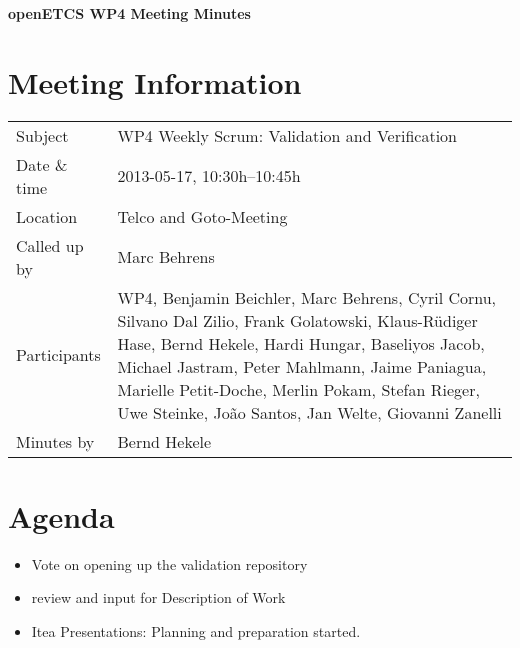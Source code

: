 \documentclass[a4paper, 11pt]{article}
\begin{document}
{\begin{center}\huge\bf openETCS WP4 Meeting Minutes\end{center}}
\section{Meeting Information}

\renewcommand{\arraystretch}{1.5}
\begin{supertabular}{m{.2\textwidth}m{.8\textwidth}}
Subject & WP4 Weekly Scrum: Validation and Verification\\
Date \& time & 2013-05-17, 10:30h--10:45h\\
Location & Telco and Goto-Meeting\\
Called up by & Marc Behrens\\
Participants & WP4,
Benjamin Beichler,
Marc Behrens,
Cyril Cornu, 
Silvano Dal Zilio,
Frank Golatowski, 
Klaus-R\"udiger Hase,
Bernd Hekele,
Hardi Hungar,
Baseliyos Jacob,
Michael Jastram, 
Peter Mahlmann, 
Jaime Paniagua,
Marielle Petit-Doche, 
Merlin Pokam,
Stefan Rieger,
Uwe Steinke,
Jo\~ao Santos,
Jan Welte,
Giovanni Zanelli\\

Minutes by & Bernd Hekele\\

\end{supertabular}
\renewcommand{\arraystretch}{1.0}


\section{{Agenda}}
\begin{itemize}
\item Vote on opening up the validation repository
\item review and input for Description of Work
\item Itea Presentations: Planning and preparation started.

\end{itemize}
\end{document}

